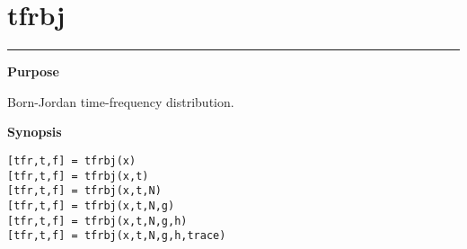 

\section*{\hspace*{-1.6cm} tfrbj}

\vspace*{-.4cm}
\hspace*{-1.6cm}\rule[0in]{16.5cm}{.02cm}
\vspace*{.2cm}

{\bf \large \sf Purpose}\\
\hspace*{1.5cm}
\begin{minipage}[t]{13.5cm}
Born-Jordan time-frequency distribution.
\end{minipage}
\vspace*{.3cm}

{\bf \large \sf Synopsis}\\
\hspace*{1.5cm}
\begin{minipage}[t]{13.5cm}
\begin{verbatim}
[tfr,t,f] = tfrbj(x)
[tfr,t,f] = tfrbj(x,t)
[tfr,t,f] = tfrbj(x,t,N)
[tfr,t,f] = tfrbj(x,t,N,g)
[tfr,t,f] = tfrbj(x,t,N,g,h)
[tfr,t,f] = tfrbj(x,t,N,g,h,trace)
\end{verbatim}
\end{minipage}
\vspace*{.5cm}

